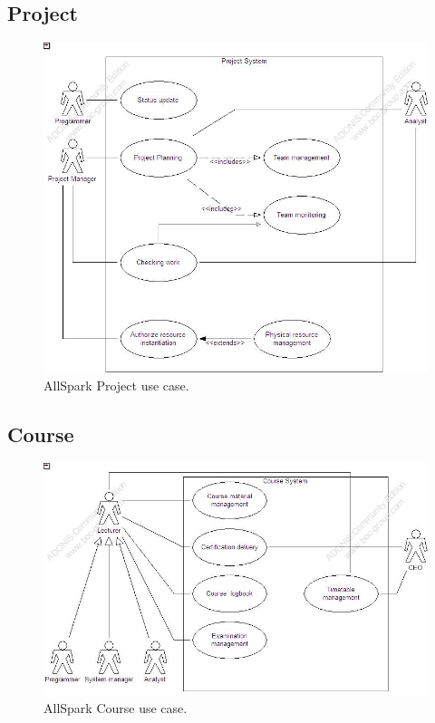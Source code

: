 \subsection{Project}
\begin{figure}
\begin{centering}
\includegraphics[scale=0.45]{assign3/adonis/imgs/project.jpg}
\caption{AllSpark Project use case.}
\label{2img:[use]project}
\end{centering}
\end{figure}

\subsection{Course}
\begin{figure}
\begin{centering}
\includegraphics[scale=0.45]{assign3/adonis/imgs/course.jpg}
\caption{AllSpark Course use case.}
\label{2img:[use]Course}
\end{centering}
\end{figure}

